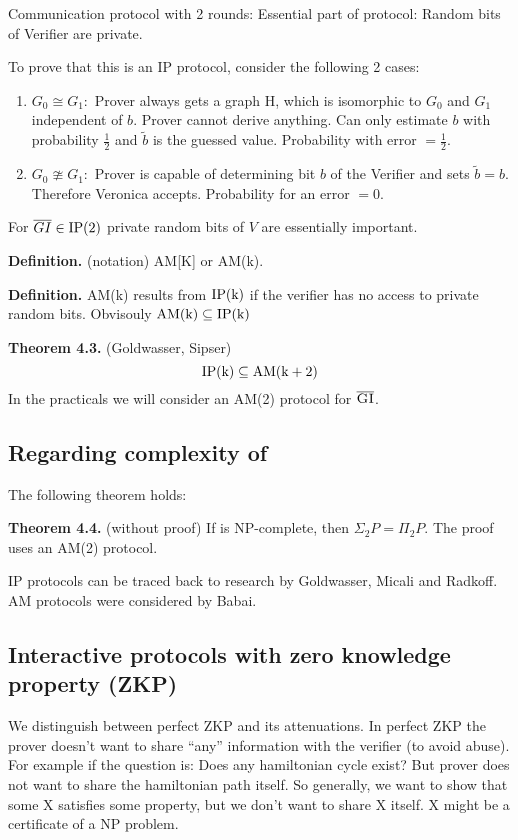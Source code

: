\documentclass[a4paper]{article}
\newcommand{\cls}[1]{\rm{#1}}
\newcommand{\probl}[1]{\text{\textsc{#1}}}
\begin{document}
Communication protocol with 2 rounds:
Essential part of protocol: Random bits of Verifier are private.

To prove that this is an \cls{IP} protocol, consider the following 2 cases:
\begin{enumerate}
  \item $G_0 \cong G_1:$ Prover always gets a graph H, which is isomorphic to
        $G_0$ and $G_1$ independent of $b$. Prover cannot derive anything.
        Can only estimate $b$ with probability $\frac12$ and $\tilde{b}$ is
        the guessed value. Probability with error $=\frac12$.
  \item $G_0 \ncong G_1:$
        Prover is capable of determining bit $b$ of the Verifier and sets
        $\tilde{b} = b$. Therefore Veronica accepts. Probability for an error $= 0$.
\end{enumerate}

For $\overline{GI} \in \cls{IP}(2)$ private random bits of $V$ are
essentially important.

\textbf{Definition.} (notation) AM[K] or AM(k).

\textbf{Definition.}
  AM(k) results from $\cls{IP}(k)$ if the verifier has no access
  to private random bits. Obvisouly $\cls{AM(k)} \subseteq \cls{IP(k)}$

\textbf{Theorem 4.3.} (Goldwasser, Sipser)
\[
  \cls{IP}(k) \subseteq \cls{AM}(k+2)
\]
%
In the practicals we will consider an AM(2) protocol for $\overline{\probl{GI}}$.

\subsection{Regarding complexity of \probl{GI}}
%
The following theorem holds:

\textbf{Theorem 4.4.} (without proof)
  If \probl{GI} is \cls{NP}-complete, then $\Sigma_2 P = \Pi_2 P$.
  The proof uses an AM(2) protocol.

\cls{IP} protocols can be traced back to research by Goldwasser, Micali and Radkoff.
\cls{AM} protocols were considered by Babai.

\subsection{Interactive protocols with zero knowledge property (ZKP)}
\label{sec:4.3}
%
We distinguish between perfect ZKP and its attenuations. In perfect ZKP the prover
doesn't want to share ``any'' information with the verifier (to avoid abuse).
For example if the question is: Does any hamiltonian cycle exist? But prover
does not want to share the hamiltonian path itself. So generally, we want to
show that some X satisfies some property, but we don't want to share X itself.
X might be a certificate of a \cls{NP} problem.
\end{document}
